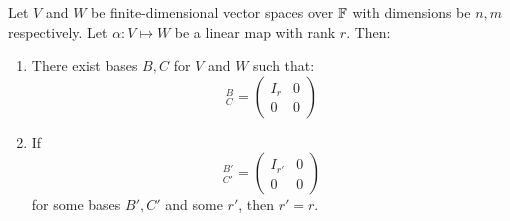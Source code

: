\documentclass[../Main.tex]{subfiles}
\begin{document}
\begin{theorem}
    Let $V$ and $W$ be finite-dimensional vector spaces over $\mathbb{F}$ with dimensions be $n, m$ respectively. Let $\alpha : V \mapsto W$ be a linear map with rank $r$. Then:
    \begin{enumerate}
        \item There exist bases $B, C$ for $V$ and $W$ such that:
            \begin{equation*}
                [\alpha]_C^B =
                \begin{pmatrix}
                    I_r & 0 \\
                    0 & 0
                \end{pmatrix}
            \end{equation*}
        \item If
            \begin{equation*}
                [\alpha]_{C'}^{B'} =
                \begin{pmatrix}
                    I_{r'} & 0 \\
                    0 & 0
                \end{pmatrix}
            \end{equation*}
            for some bases $B', C'$ and some $r'$, then $r' = r$.
    \end{enumerate}
    \label{thmBlockMatDecomp}
\end{theorem}
\end{document}
